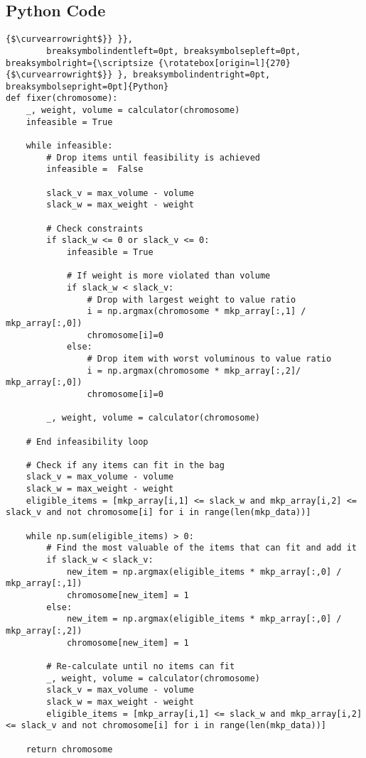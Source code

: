 \documentclass[12pt,letterpaper]{exam}
\begin{document}
	\clearpage
	\begin{appendices}
	
	\section{Python Code} \label{appendix:ipynb}
	\begin{verbatim}{$\curvearrowright$}} }},
		breaksymbolindentleft=0pt, breaksymbolsepleft=0pt, breaksymbolright={\scriptsize {\rotatebox[origin=l]{270}{$\curvearrowright$}} }, breaksymbolindentright=0pt, breaksymbolsepright=0pt]{Python}
def fixer(chromosome):
	_, weight, volume = calculator(chromosome)
	infeasible = True
	
	while infeasible:
		# Drop items until feasibility is achieved
		infeasible =  False
		
		slack_v = max_volume - volume
		slack_w = max_weight - weight
		
		# Check constraints
		if slack_w <= 0 or slack_v <= 0: 
			infeasible = True
		
			# If weight is more violated than volume
			if slack_w < slack_v:
				# Drop with largest weight to value ratio
				i = np.argmax(chromosome * mkp_array[:,1] / mkp_array[:,0])
				chromosome[i]=0
			else:
				# Drop item with worst voluminous to value ratio
				i = np.argmax(chromosome * mkp_array[:,2]/ mkp_array[:,0])
				chromosome[i]=0
		
		_, weight, volume = calculator(chromosome)
	
	# End infeasibility loop
	
	# Check if any items can fit in the bag
	slack_v = max_volume - volume
	slack_w = max_weight - weight
	eligible_items = [mkp_array[i,1] <= slack_w and mkp_array[i,2] <= slack_v and not chromosome[i] for i in range(len(mkp_data))]
	
	while np.sum(eligible_items) > 0:
		# Find the most valuable of the items that can fit and add it
		if slack_w < slack_v:
			new_item = np.argmax(eligible_items * mkp_array[:,0] / mkp_array[:,1])
			chromosome[new_item] = 1
		else:
			new_item = np.argmax(eligible_items * mkp_array[:,0] / mkp_array[:,2])
			chromosome[new_item] = 1
		
		# Re-calculate until no items can fit
		_, weight, volume = calculator(chromosome)
		slack_v = max_volume - volume
		slack_w = max_weight - weight
		eligible_items = [mkp_array[i,1] <= slack_w and mkp_array[i,2] <= slack_v and not chromosome[i] for i in range(len(mkp_data))]
	
	return chromosome
	\end{verbatim}
	
	\end{appendices}
\end{document}
